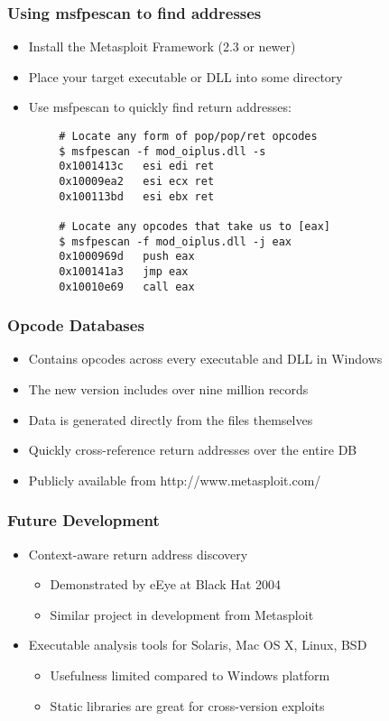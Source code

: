 \documentclass{beamer}
\newenvironment{sitemize}{\vspace{1mm}\begin{itemize}\itemsep 4pt\small}{\end{itemize}}
\begin{document}
\begin{frame}[fragile]
	\frametitle{Using msfpescan to find addresses}
	\begin{sitemize}
		\item Install the Metasploit Framework (2.3 or newer)
		\item Place your target executable or DLL into some directory
		\item Use msfpescan to quickly find return addresses:
	\end{sitemize}

{\footnotesize 
\begin{verbatim}
		# Locate any form of pop/pop/ret opcodes
		$ msfpescan -f mod_oiplus.dll -s
		0x1001413c   esi edi ret
		0x10009ea2   esi ecx ret	
		0x100113bd   esi ebx ret

		# Locate any opcodes that take us to [eax]
		$ msfpescan -f mod_oiplus.dll -j eax
		0x1000969d   push eax
		0x100141a3   jmp eax
		0x10010e69   call eax
\end{verbatim} 
}
\end{frame}

\begin{frame}[t]
	\frametitle{Opcode Databases}
	\begin{sitemize}
		\item Contains opcodes across every executable and DLL in Windows
		\item The new version includes over nine million records
		\item Data is generated directly from the files themselves
		\item Quickly cross-reference return addresses over the entire DB
		\item Publicly available from http://www.metasploit.com/
	\end{sitemize}	
\end{frame}

\begin{frame}[t]
	\frametitle{Future Development}
	\begin{sitemize}
		\item Context-aware return address discovery
		\begin{sitemize}
			\item Demonstrated by eEye at Black Hat 2004
			\item Similar project in development from Metasploit
		\end{sitemize}
	\end{sitemize}
	\pause
	
	\begin{sitemize}
		\item Executable analysis tools for Solaris, Mac OS X, Linux, BSD
		\begin{sitemize}
			\item Usefulness limited compared to Windows platform
			\item Static libraries are great for cross-version exploits
		\end{sitemize}
	\end{sitemize}	
\end{frame}
\end{document}

